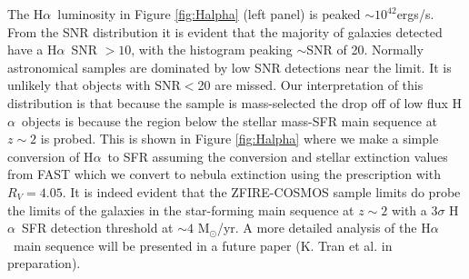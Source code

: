 \documentclass[iop]{emulateapj}
\newcommand{\Halpha}{H$\alpha$}
\newcommand{\msol}{M$_\odot$}
\newcommand{\around}{$\sim$}
\begin{document}
The \Halpha\ luminosity in Figure \ref{fig:Halpha} (left panel) is peaked $\sim10^{42}$ergs/s. From the SNR distribution it is evident that the majority of galaxies detected have a \Halpha\ SNR $>10$, with the histogram peaking \around SNR of 20.
Normally astronomical samples are dominated by low SNR detections near the limit. 
It is unlikely that objects with SNR$<$20 are missed. Our  interpretation of  this distribution is that because  the sample is mass-selected the drop off of low flux \Halpha\ objects is because the region below the stellar mass-SFR main sequence \citep{Tomczak2014} at $z\sim 2$ is probed. 
This is shown in Figure \ref{fig:Halpha} where we make a simple conversion of \Halpha\ to SFR assuming the \citet{Kennicutt1998}  conversion and stellar extinction values from FAST
which we convert to nebula extinction using the  \citet{Calzetti2000} prescription  with  $R_V=4.05$. 
It is indeed evident that the ZFIRE-COSMOS sample limits do probe the limits of the galaxies in the star-forming main sequence at $z\sim2$ with a $3\sigma$ \Halpha\ SFR detection threshold at $\sim4$ \msol/yr. A more detailed analysis of the \Halpha\ main sequence will be presented in a future paper (K. Tran et al. in preparation). 

\end{document}
